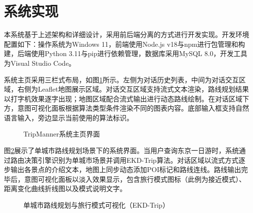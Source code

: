 
\section{系统实现}
\label{sec:ch5_implementation}

本系统基于上述架构和详细设计，采用前后端分离的方式进行开发实现。开发环境配置如下：操作系统为Windows 11，前端使用Node.js v18与npm进行包管理和构建，后端使用Python 3.11与pip进行依赖管理，数据库采用MySQL 8.0，开发工具为Visual Studio Code。

系统主页采用三栏式布局，如图\ref{fig:ch5_impl_main}所示。左侧为对话历史列表，中间为对话交互区域，右侧为Leaflet地图展示区域。对话交互区域支持流式文本渲染，路线规划结果以打字机效果逐字出现；地图区域配合流式输出进行动态路线绘制。在对话区域下方，意图可视化面板根据算法类型条件渲染不同的图表内容。底部输入框支持自然语言输入，旁边显示当前使用的算法标识。

\begin{figure}[hbt]
  \centering
  \caption{TripManner系统主页界面}
  \label{fig:ch5_impl_main}
\end{figure}

图\ref{fig:ch5_impl_ekd}展示了单城市路线规划场景下的系统界面。当用户查询东京一日游时，系统通过路由决策引擎识别为单城市场景并调用EKD-Trip算法。对话区域以流式方式逐步输出各景点的介绍文本，地图上同步动态添加POI标记和路线连线。路线输出完毕后，意图可视化面板以淡入效果显示，包含旅行模式图标（此例为接近模式）、距离变化曲线折线图以及模式说明文字。

\begin{figure}[hbt]
  \centering
  \caption{单城市路线规划与旅行模式可视化（EKD-Trip）}
  \label{fig:ch5_impl_ekd}
\end{figure}

